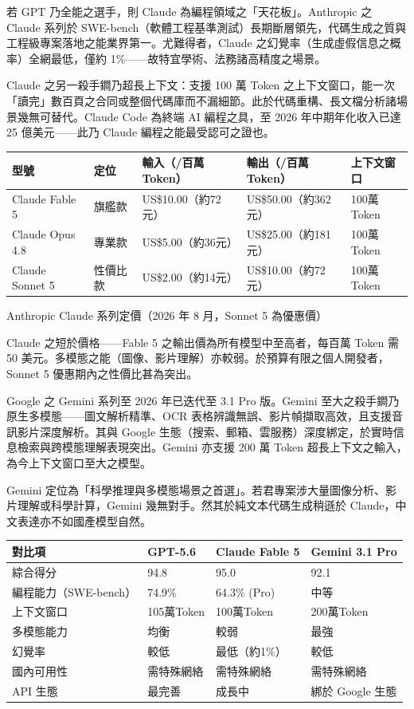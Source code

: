 
若 GPT 乃全能之選手，則 Claude 為編程領域之「天花板」。Anthropic 之 Claude 系列於 SWE-bench（軟體工程基準測試）長期斷層領先，代碼生成之質與工程級專案落地之能業界第一。尤難得者，Claude 之幻覺率（生成虛假信息之概率）全網最低，僅約 1\%——故特宜學術、法務諸高精度之場景。

Claude 之另一殺手鐧乃超長上下文：支援 100 萬 Token 之上下文窗口，能一次「讀完」數百頁之合同或整個代碼庫而不漏細節。此於代碼重構、長文檔分析諸場景幾無可替代。Claude Code 為終端 AI 編程之具，至 2026 年中期年化收入已達 25 億美元——此乃 Claude 編程之能最受認可之證也。

\begin{center}
\begin{tabularx}{\linewidth}{|X|X|X|X|X|}
\hline
\textbf{型號} & \textbf{定位} & \textbf{輸入（/百萬Token）} & \textbf{輸出（/百萬Token）} & \textbf{上下文窗口} \tabularnewline
\hline
Claude Fable 5 & 旗艦款 & US\$10.00（約72元） & US\$50.00（約362元） & 100萬Token \tabularnewline
Claude Opus 4.8 & 專業款 & US\$5.00（約36元） & US\$25.00（約181元） & 100萬Token \tabularnewline
Claude Sonnet 5 & 性價比款 & US\$2.00（約14元） & US\$10.00（約72元） & 100萬Token \tabularnewline
\hline
\end{tabularx}
\end{center}

\begin{center}\small\color{gray}Anthropic Claude 系列定價（2026 年 8 月，Sonnet 5 為優惠價）\end{center}

Claude 之短於價格——Fable 5 之輸出價為所有模型中至高者，每百萬 Token 需 50 美元。多模態之能（圖像、影片理解）亦較弱。於預算有限之個人開發者，Sonnet 5 優惠期內之性價比甚為突出。


Google 之 Gemini 系列至 2026 年已迭代至 3.1 Pro 版。Gemini 至大之殺手鐧乃原生多模態——圖文解析精準、OCR 表格辨識無誤、影片幀擷取高效，且支援音訊影片深度解析。其與 Google 生態（搜索、郵箱、雲服務）深度綁定，於實時信息檢索與跨模態理解表現突出。Gemini 亦支援 200 萬 Token 超長上下文之輸入，為今上下文窗口至大之模型。

Gemini 定位為「科學推理與多模態場景之首選」。若君專案涉大量圖像分析、影片理解或科學計算，Gemini 幾無對手。然其於純文本代碼生成稍遜於 Claude，中文表達亦不如國產模型自然。

\begin{center}
\begin{tabularx}{\linewidth}{|X|X|X|X|}
\hline
\textbf{對比項} & \textbf{GPT-5.6} & \textbf{Claude Fable 5} & \textbf{Gemini 3.1 Pro} \tabularnewline
\hline
綜合得分 & 94.8 & 95.0 & 92.1 \tabularnewline
編程能力（SWE-bench） & 74.9\% & 64.3\% (Pro) & 中等 \tabularnewline
上下文窗口 & 105萬Token & 100萬Token & 200萬Token \tabularnewline
多模態能力 & 均衡 & 較弱 & 最強 \tabularnewline
幻覺率 & 較低 & 最低（約1\%） & 較低 \tabularnewline
國內可用性 & 需特殊網絡 & 需特殊網絡 & 需特殊網絡 \tabularnewline
API 生態 & 最完善 & 成長中 & 綁於 Google 生態 \tabularnewline
\hline
\end{tabularx}
\end{center}

